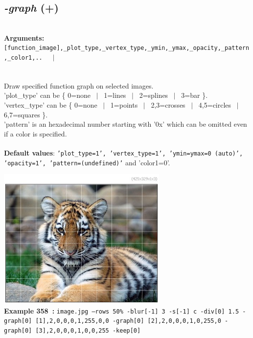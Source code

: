 \documentclass[a4paper,11pt,twoside]{book}
\begin{document}
\subsection{\emph{-graph} (+)}\vspace*{-0.5em}
~\\\textbf{Arguments: } 
{\small \texttt{[function\_image],\_plot\_type,\_vertex\_type,\_ymin,\_ymax,\_opacity,\_pattern,\_color1,..}}~~~$|$\\
\\~\\
Draw specified function graph on selected images.
~\\'plot\_type' can be \{ 0=none ~$|$~ 1=lines ~$|$~ 2=splines ~$|$~ 3=bar \}.
~\\'vertex\_type' can be \{ 0=none ~$|$~ 1=points ~$|$~ 2,3=crosses ~$|$~ 4,5=circles ~$|$~ 6,7=squares \}.
~\\'pattern' is an hexadecimal number starting with '0x' which can be omitted
even if a color is specified.
~\\~\\\textbf{Default values}: {\small \texttt{'plot\_type=1', 'vertex\_type=1', 'ymin=ymax=0 (auto)', 'opacity=1', 'pattern=(undefined)'}}
and 'color1=0'.
\begin{center}\includegraphics[keepaspectratio=true,height=7cm,width=\textwidth]{img/gmic_def358.jpg}\\
{\footnotesize \textbf{Example 358~:} \texttt{image.jpg --rows 50\% -blur[-1] 3 -s[-1] c -div[0] 1.5 -graph[0] [1],2,0,0,0,1,255,0,0 -graph[0] [2],2,0,0,0,1,0,255,0 -graph[0] [3],2,0,0,0,1,0,0,255 -keep[0]}}
\end{center}
\end{document}
